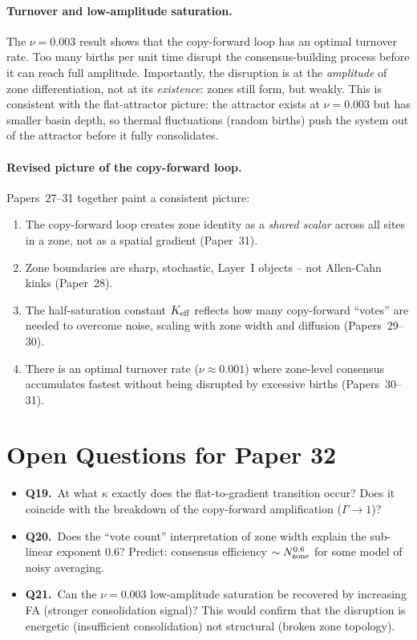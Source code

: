 \documentclass[11pt,a4paper]{article}
\begin{document}
\paragraph{Turnover and low-amplitude saturation.}
The $\nu=0.003$ result shows that the copy-forward loop has an optimal turnover rate.
Too many births per unit time disrupt the consensus-building process before it can reach
full amplitude.  Importantly, the disruption is at the \emph{amplitude} of zone
differentiation, not at its \emph{existence}: zones still form, but weakly.  This is
consistent with the flat-attractor picture: the attractor exists at $\nu=0.003$ but has
smaller basin depth, so thermal fluctuations (random births) push the system out of the
attractor before it fully consolidates.

\paragraph{Revised picture of the copy-forward loop.}
Papers~27--31 together paint a consistent picture:
\begin{enumerate}
  \item The copy-forward loop creates zone identity as a \emph{shared scalar} across all
    sites in a zone, not as a spatial gradient (Paper~31).
  \item Zone boundaries are sharp, stochastic, Layer~I objects -- not Allen-Cahn kinks
    (Paper~28).
  \item The half-saturation constant $K_{\rm eff}$ reflects how many copy-forward
    ``votes'' are needed to overcome noise, scaling with zone width and diffusion
    (Papers~29--30).
  \item There is an optimal turnover rate ($\nu \approx 0.001$) where zone-level consensus
    accumulates fastest without being disrupted by excessive births (Papers~30--31).
\end{enumerate}

\section{Open Questions for Paper 32}
\label{sec:openq}

\begin{itemize}
  \item \textbf{Q19.}\ At what $\kappa$ exactly does the flat-to-gradient transition
    occur?  Does it coincide with the breakdown of the copy-forward amplification
    ($\Gamma \to 1$)?
  \item \textbf{Q20.}\ Does the ``vote count'' interpretation of zone width explain
    the sub-linear exponent $0.6$?  Predict: consensus efficiency $\sim N_{\rm zone}^{0.6}$
    for some model of noisy averaging.
  \item \textbf{Q21.}\ Can the $\nu=0.003$ low-amplitude saturation be recovered by
    increasing FA (stronger consolidation signal)?  This would confirm that the
    disruption is energetic (insufficient consolidation) not structural (broken zone
    topology).
\end{itemize}
\end{document}
